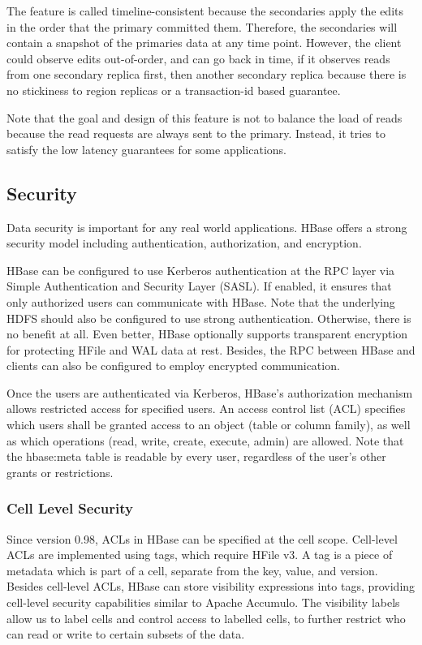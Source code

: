 \documentclass[12pt]{book}
\begin{document}
The feature is called timeline-consistent because the secondaries apply the edits in the order that the primary committed them. Therefore, the secondaries will contain a snapshot of the primaries data at any time point. However, the client could observe edits out-of-order, and can go back in time, if it observes reads from one secondary replica first, then another secondary replica because there is no stickiness to region replicas or a transaction-id based guarantee.

Note that the goal and design of this feature is not to balance the load of reads because the read requests are always sent to the primary. Instead, it tries to satisfy the low latency guarantees for some applications.

\subsection{Security}
Data security is important for any real world applications. HBase offers a strong security model including authentication, authorization, and encryption.

HBase can be configured to use Kerberos authentication at the RPC layer via Simple Authentication and Security Layer (SASL). If enabled, it ensures that only authorized users can communicate with HBase. Note that the underlying HDFS should also be configured to use strong authentication. Otherwise, there is no benefit at all. Even better, HBase optionally supports transparent encryption for protecting HFile and WAL data at rest. Besides, the RPC between HBase and clients can also be configured to employ encrypted communication.

Once the users are authenticated via Kerberos, HBase's authorization mechanism allows restricted access for specified users.
An access control list (ACL) specifies which users shall be granted access to an object (table or column family), as well as which operations (read, write, create, execute, admin) are allowed. Note that the hbase:meta table is readable by every user, regardless of the user's other grants or restrictions.

\subsubsection{Cell Level Security}

Since version 0.98, ACLs in HBase can be specified at the cell scope. Cell-level ACLs are implemented using tags, which require HFile v3. A tag is a piece of metadata which is part of a cell, separate from the key, value, and version.  Besides cell-level ACLs,  HBase can store visibility expressions into tags, providing cell-level security capabilities similar to Apache Accumulo. The visibility labels allow us to label cells and control access to labelled cells, to further restrict who can read or write to certain subsets of the data. 
\end{document}
